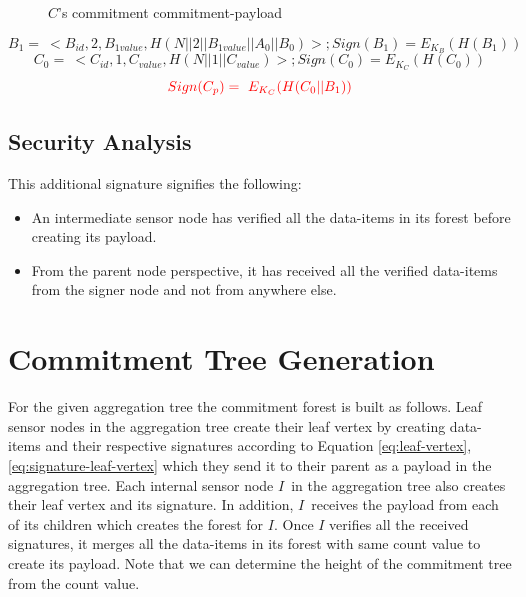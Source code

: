 \begin{exmp}
\begin{figure}[h!]
				\caption{$C$'s commitment commitment-payload}
				\label{fig:Commitment payload of C}
			\end{figure}
		\begin{equation}	
			B_{1} =\ <B_{id}, 2, B_{1value}, H(N||2||B_{1value}||A_{0}||B_{0})>; Sign(B_{1}) = E_{K_{B}}(H(B_{1}))
		\end{equation}
		\begin{equation}
			C_{0} =\ <C_{id}, 1, C_{value}, H(N||1||C_{value})>; Sign(C_{0}) = E_{K_{C}}(H(C_{0}))
		\end{equation}
		\begin{equation}
			\textcolor{red}{Sign(C_{p}) =\	E_{K_{C}}(H(C_{0} || B_{1}))}
		\end{equation}
	\end{exmp}
	\subsection{Security Analysis}

	This additional signature signifies the following:
	\begin{itemize}
		\item	An intermediate sensor node has verified all the data-items in its forest before creating its payload.
		\item From the parent node perspective, it has received all the verified data-items from the signer node and not from anywhere else.
	\end{itemize}

	\section{Commitment Tree Generation}
	For the given aggregation tree the commitment forest is built as follows.
	Leaf sensor nodes in the aggregation tree create their leaf vertex by creating data-items and their respective signatures according to Equation \ref{eq:leaf-vertex}, \ref{eq:signature-leaf-vertex} which they send it to their parent as a payload in the aggregation tree.
	Each internal sensor node $I$\ in the aggregation tree also creates their leaf vertex and its signature.
	In addition, $I$\ receives the payload from each of its children which creates the forest for $I$.
	Once $I$ verifies all the received signatures, it merges all the data-items in its forest with same count value to create its payload.
	Note that we can determine the height of the commitment tree from the count value.

